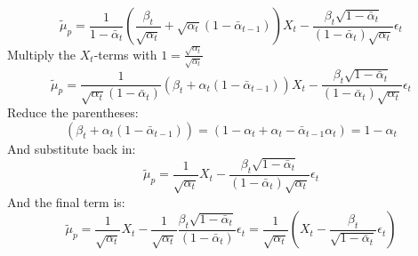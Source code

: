 \begin{equation}
    \tilde{\mu}_p = \frac{1}{1-\bar{\alpha}_{t}}\left( \frac{\beta_t}{\sqrt{\alpha_t}} + \sqrt{\alpha_t} (1-\bar{\alpha}_{t-1}) \right) X_t - \frac{\beta_t \sqrt{1-\bar{\alpha}_t} }{(1-\bar{\alpha}_t) \sqrt{\alpha_t}} \epsilon_t
\end{equation}
Multiply the $X_t$-terms with $1 = \frac{\sqrt{\alpha_t}}{\sqrt{\alpha_t}}$
\begin{equation}
    \tilde{\mu}_p = \frac{1}{\sqrt{\alpha_t} (1-\bar{\alpha}_{t})}\left( \beta_t + \alpha_t (1-\bar{\alpha}_{t-1}) \right) X_t - \frac{\beta_t \sqrt{1-\bar{\alpha}_t} }{(1-\bar{\alpha}_t) \sqrt{\alpha_t}} \epsilon_t
\end{equation}
Reduce the parentheses:
\begin{equation}
    \left( \beta_t + \alpha_t (1-\bar{\alpha}_{t-1}) \right) = \left( 1 - \alpha_t + \alpha_t - \bar{\alpha}_{t-1} \alpha_t \right) = 1 - \alpha_t
\end{equation}
And substitute back in:
\begin{equation}
    \tilde{\mu}_p = \frac{1}{\sqrt{\alpha_t}} X_t - \frac{\beta_t \sqrt{1-\bar{\alpha}_t} }{(1-\bar{\alpha}_t) \sqrt{\alpha_t}} \epsilon_t
\end{equation}
And the final term is:
\begin{equation}
    \tilde{\mu}_p = \frac{1}{\sqrt{\alpha_t}} X_t - \frac{1}{\sqrt{\alpha_t}} \frac{\beta_t \sqrt{1-\bar{\alpha}_t} }{(1-\bar{\alpha}_t)} \epsilon_t = \frac{1}{\sqrt{\alpha_t}} \left( X_t - \frac{\beta_t}{\sqrt{1-\bar{\alpha}_t}} \epsilon_t \right)
\end{equation}